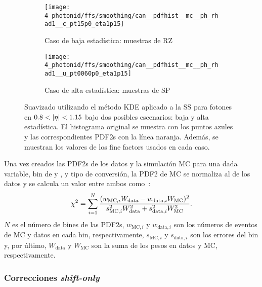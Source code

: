 \begin{figure}[ht!]
    \centering
    \begin{subfigure}[h]{0.49\linewidth}
        \centering
        \texttt{[image: 4\_photonid/ffs/smoothing/can\_\_pdfhist\_\_mc\_\_ph\_rhad1\_\_c\_pt15p0\_eta1p15]}
        \caption{Caso de baja estad\'istica: muestras de \ac{RZ}}
    \end{subfigure}
    \hfill
    \begin{subfigure}[h]{0.49\linewidth}
        \centering
        \texttt{[image: 4\_photonid/ffs/smoothing/can\_\_pdfhist\_\_mc\_\_ph\_rhad1\_\_u\_pt0060p0\_eta1p15]}
        \caption{Caso de alta estad\'istica: muestras de \ac{SP}}
    \end{subfigure}
    \caption{Suavizado utilizando el m\'etodo \ac{KDE} aplicado a la \ac{SS} \rhad para fotones en \(0.8<\abseta<1.15\) bajo dos posibles escenarios: baja y alta estad\'istica. El histograma original se muestra con los puntos azules y las correspondientes \acp{PDF2} con la l\'inea naranja. Adem\'as, se muestran los valores de los fine factors usados en cada caso.}
    \label{fig:ss_corrections:ffs:calculation:smoothing_ss}
\end{figure}


Una vez creados las \acp{PDF2} de los datos y la simulaci\'on \ac{MC} para una dada variable, bin de \pt y \abseta, y tipo de conversión, la \ac{PDF2} de \ac{MC} se normaliza al de los datos y se calcula un valor \chisq entre ambos como~\cite{Chi2Histograms}:
\begin{equation}
	\chi^{2} = \sum_{i=1}^{N} \dfrac{(w_{\text{MC},i} W_{\text{data}} - w_{\text{data},i} W_{\text{MC}})^2}{s_{\text{MC},i}^2 W_{\text{data}}^2 + s_{\text{data},i}^2 W_{\text{MC}}^2}.
\end{equation}
\(N\) es el número de bines de las \acp{PDF2}, \(w_{\text{MC},i}\) y \(w_{\text{data},i}\) son los números de eventos de \ac{MC} y datos en cada bin, respectivamente, \(s_{\text{MC},i}\) y \(s_{\text{data},i}\) son los errores del bin y, por último, \(W_{\text{data}}\) y \(W_{\text{MC}}\) son la suma de los pesos en datos y \ac{MC}, respectivamente.

\subsubsection{Correcciones \textit{shift-only}}

